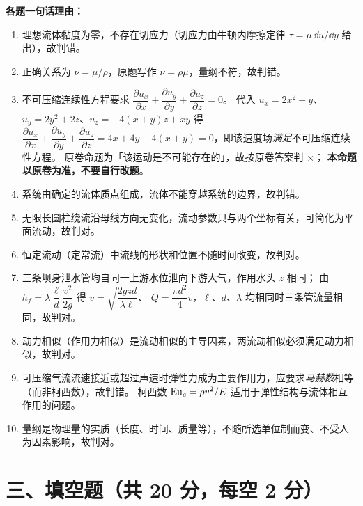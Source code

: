 \begin{tishi}
\textbf{各题一句话理由：}
\begin{enumerate}
  \item 理想流体黏度为零，不存在切应力（切应力由牛顿内摩擦定律 $\tau=\mu\,\dd u/\dd y$ 给出），故判错。
  \item 正确关系为 $\nu=\mu/\rho$，原题写作 $\nu=\rho\mu$，量纲不符，故判错。
  \item 不可压缩连续性方程要求
        $\dfrac{\partial u_x}{\partial x}+\dfrac{\partial u_y}{\partial y}+\dfrac{\partial u_z}{\partial z}=0$。
        代入 $u_x=2x^{2}+y$、$u_y=2y^{2}+2z$、$u_z=-4(x+y)z+xy$ 得
        $\dfrac{\partial u_x}{\partial x}+\dfrac{\partial u_y}{\partial y}+\dfrac{\partial u_z}{\partial z}
        =4x+4y-4(x+y)=0$，即该速度场\emph{满足}不可压缩连续性方程。
        原卷命题为「该运动是不可能存在的」，故按原卷答案判 $\times$；
        \textbf{本命题以原卷为准，不要自行改题}。
  \item 系统由确定的流体质点组成，流体不能穿越系统的边界，故判错。
  \item 无限长圆柱绕流沿母线方向无变化，流动参数只与两个坐标有关，可简化为平面流动，故判对。
  \item 恒定流动（定常流）中流线的形状和位置不随时间改变，故判对。
  \item 三条坝身泄水管均自同一上游水位泄向下游大气，作用水头 $z$ 相同；
        由 $h_f=\lambda\dfrac{\ell}{d}\dfrac{v^{2}}{2g}$ 得 $v=\sqrt{\dfrac{2gzd}{\lambda\ell}}$、
        $Q=\dfrac{\pi d^{2}}{4}v$，$\ell$、$d$、$\lambda$ 均相同时三条管流量相同，故判对。
  \item 动力相似（作用力相似）是流动相似的主导因素，两流动相似必须满足动力相似，故判对。
  \item 可压缩气流流速接近或超过声速时弹性力成为主要作用力，应要求\emph{马赫数}相等（而非柯西数），故判错。
        柯西数 $\mathrm{Eu}_c=\rho v^{2}/E$ 适用于弹性结构与流体相互作用的问题。
  \item 量纲是物理量的实质（长度、时间、质量等），不随所选单位制而变、不受人为因素影响，故判对。
\end{enumerate}
\end{tishi}

\section{三、填空题（共 20 分，每空 2 分）}

